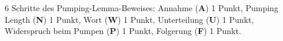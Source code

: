 \begin{bewertung}
6 Schritte des Pumping-Lemma-Beweises:
Annahme ({\bf A}) 1 Punkt,
Pumping Length ({\bf N}) 1 Punkt,
Wort ({\bf W}) 1 Punkt,
Unterteilung ({\bf U}) 1 Punkt,
Widerspruch beim Pumpen ({\bf P}) 1 Punkt,
Folgerung ({\bf F}) 1 Punkt.
\end{bewertung}

